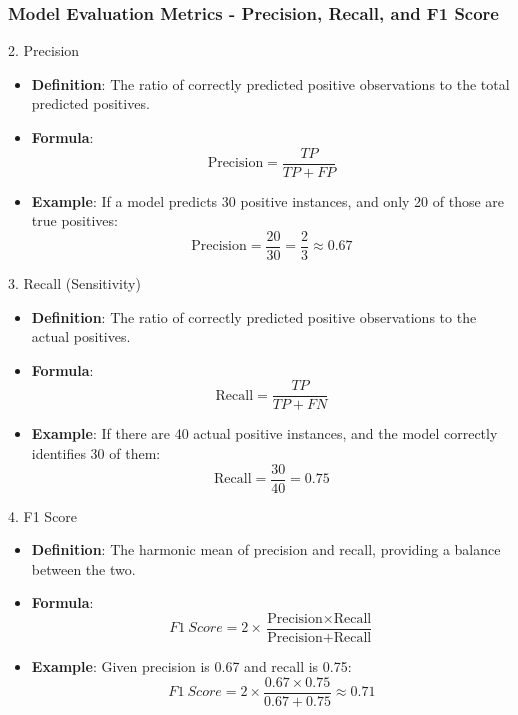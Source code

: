 \documentclass{beamer}
\begin{document}
\begin{frame}[fragile]
    \frametitle{Model Evaluation Metrics - Precision, Recall, and F1 Score}
    \begin{block}{2. Precision}
        \begin{itemize}
            \item \textbf{Definition}: The ratio of correctly predicted positive observations to the total predicted positives.
            \item \textbf{Formula}: 
            \[
            \text{Precision} = \frac{TP}{TP + FP}
            \]
            \item \textbf{Example}: If a model predicts 30 positive instances, and only 20 of those are true positives:
            \[
            \text{Precision} = \frac{20}{30} = \frac{2}{3} \approx 0.67
            \]
        \end{itemize}
    \end{block}
    
    \begin{block}{3. Recall (Sensitivity)}
        \begin{itemize}
            \item \textbf{Definition}: The ratio of correctly predicted positive observations to the actual positives.
            \item \textbf{Formula}: 
            \[
            \text{Recall} = \frac{TP}{TP + FN}
            \]
            \item \textbf{Example}: If there are 40 actual positive instances, and the model correctly identifies 30 of them:
            \[
            \text{Recall} = \frac{30}{40} = 0.75
            \]
        \end{itemize}
    \end{block}
    
    \begin{block}{4. F1 Score}
        \begin{itemize}
            \item \textbf{Definition}: The harmonic mean of precision and recall, providing a balance between the two.
            \item \textbf{Formula}: 
            \[
            F1\ Score = 2 \times \frac{\text{Precision} \times \text{Recall}}{\text{Precision} + \text{Recall}}
            \]
            \item \textbf{Example}: Given precision is 0.67 and recall is 0.75:
            \[
            F1\ Score = 2 \times \frac{0.67 \times 0.75}{0.67 + 0.75} \approx 0.71
            \]
        \end{itemize}
    \end{block}
\end{frame}
\end{document}
